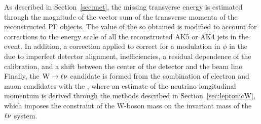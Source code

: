 As described in Section~\ref{sec:met}, the missing transverse energy is estimated through the magnitude of the vector sum of the transverse momenta of the reconstructed PF objects.
The value of the \ETmiss so obtained is modified to account for corrections to the energy scale of all the reconstructed AK5 or AK4 jets in the event.
In addition, a correction applied to correct for a modulation in $\phi$ in the \ptvecmiss due to imperfect detector alignment, inefficiencies, a residual \pt dependence of the calibration, and a shift between the center of the detector and the beam line.\\

Finally, the $\mathrm{W}\to\ell\nu$ candidate is formed from the combination of electron and muon candidates with the \ptvecmiss,
where an estimate of the neutrino longitudinal momentum is derived through the methods described in Section~\ref{sec:leptonicW},
which imposes the constraint of the W-boson mass on the invariant mass of the $\ell\nu$ system.